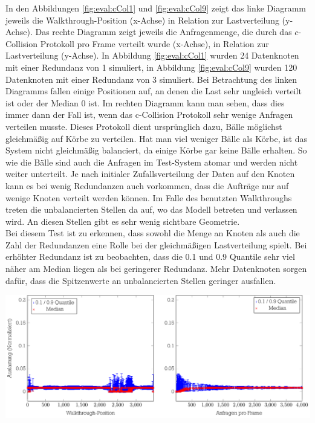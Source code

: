 In den Abbildungen \ref{fig:eval:cCol1} und \ref{fig:eval:cCol9} zeigt das linke Diagramm jeweils die Walkthrough-Position (x-Achse) in Relation zur Lastverteilung (y-Achse). Das rechte Diagramm zeigt jeweils die Anfragenmenge, die durch das $c$-Collision Protokoll pro Frame verteilt wurde (x-Achse), in Relation zur Lastverteilung (y-Achse). In Abbildung \ref{fig:eval:cCol1} wurden 24 Datenknoten mit einer Redundanz von 1 simuliert, in Abbildung \ref{fig:eval:cCol9} wurden 120 Datenknoten mit einer Redundanz von 3 simuliert. Bei Betrachtung des linken Diagramms fallen einige Positionen auf, an denen die Last sehr ungleich verteilt ist oder der Median 0 ist. Im rechten Diagramm kann man sehen, dass dies immer dann der Fall ist, wenn das c-Collision Protokoll sehr wenige Anfragen verteilen musste. Dieses Protokoll dient ursprünglich dazu, Bälle möglichst gleichmäßig auf Körbe zu verteilen. Hat man viel weniger Bälle als Körbe, ist das System nicht gleichmäßig balanciert, da einige Körbe gar keine Bälle erhalten. So wie die Bälle sind auch die Anfragen im Test-System atomar und werden nicht weiter unterteilt. Je nach initialer Zufallsverteilung der Daten auf den Knoten kann es bei wenig Redundanzen auch vorkommen, dass die Aufträge nur auf wenige Knoten verteilt werden können. Im Falle des benutzten Walkthroughs treten die unbalancierten Stellen da auf, wo das Modell betreten und verlassen wird. An diesen Stellen gibt es sehr wenig sichtbare Geometrie.\\
Bei diesem Test ist zu erkennen, dass sowohl die Menge an Knoten als auch die Zahl der Redundanzen eine Rolle bei der gleichmäßigen Lastverteilung spielt. Bei erhöhter Redundanz ist zu beobachten, dass die 0.1 und 0.9 Quantile sehr viel näher am Median liegen als bei geringerer Redundanz. Mehr Datenknoten sorgen dafür, dass die Spitzenwerte an unbalancierten Stellen geringer ausfallen.
\begin{Bild}
\includegraphics[scale=0.75]{images/diag_cCol_red3_render4_data120_2x.pdf}
\end{Bild}

